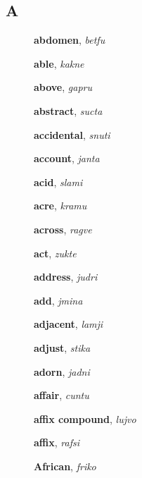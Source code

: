 \documentclass[12pt]{book}
\begin{document}
\subsection{A} %

\begin{description}
\item[ ] \textbf{abdomen}, \textit{betfu}

\item[ ] \textbf{able}, \textit{kakne}

\item[ ] \textbf{above}, \textit{gapru}

\item[ ] \textbf{abstract}, \textit{sucta}

\item[ ] \textbf{accidental}, \textit{snuti}

\item[ ] \textbf{account}, \textit{janta}

\item[ ] \textbf{acid}, \textit{slami}

\item[ ] \textbf{acre}, \textit{kramu}

\item[ ] \textbf{across}, \textit{ragve}

\item[ ] \textbf{act}, \textit{zukte}

\item[ ] \textbf{address}, \textit{judri}

\item[ ] \textbf{add}, \textit{jmina}

\item[ ] \textbf{adjacent}, \textit{lamji}

\item[ ] \textbf{adjust}, \textit{stika}

\item[ ] \textbf{adorn}, \textit{jadni}

\item[ ] \textbf{affair}, \textit{cuntu}

\item[ ] \textbf{affix compound}, \textit{lujvo}

\item[ ] \textbf{affix}, \textit{rafsi}

\item[ ] \textbf{African}, \textit{friko}


\end{description}
\end{document}
